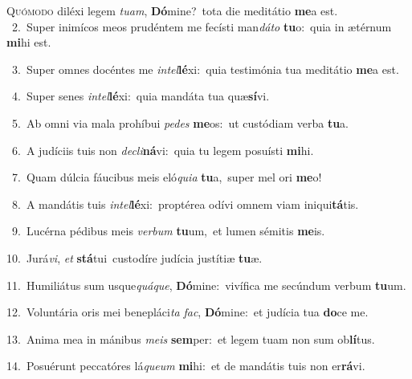 \lettrine{\initial\textcolor{\initialcolor}{Q}}{uómodo} diléxi legem \textit{tu}\-\textit{am}, \textbf{Dó}\-mine?~\star tota die meditátio \textbf{me}\-a est.\\
{\numbfont\textcolor{\numbcolor}{~2.}}~Super inimícos meos prudéntem me fecísti man\-\textit{dá}\-\textit{to} \textbf{tu}\-o:~\star quia in ætérnum \textbf{mi}\-hi est.\par
{\numbfont\textcolor{\numbcolor}{~3.}}~Super omnes docéntes me \textit{in}\-\textit{tel}\textbf{lé}xi:~\star quia testimónia tua meditátio \textbf{me}\-a est.\par
{\numbfont\textcolor{\numbcolor}{~4.}}~Super senes \textit{in}\-\textit{tel}\textbf{lé}xi:~\star quia mandáta tua quæ\-\textbf{sí}\-vi.\par
{\numbfont\textcolor{\numbcolor}{~5.}}~Ab omni via mala prohíbui \textit{pe}\-\textit{des} \textbf{me}\-os:~\star ut custódiam verba \textbf{tu}\-a.\par
{\numbfont\textcolor{\numbcolor}{~6.}}~A judíciis tuis non \textit{de}\-\textit{cli}\textbf{ná}vi:~\star quia tu legem posuísti \textbf{mi}\-hi.\par
{\numbfont\textcolor{\numbcolor}{~7.}}~Quam dúlcia fáucibus meis eló\-\textit{qui}\-\textit{a} \textbf{tu}\-a,~\star super mel ori \textbf{me}\-o!\par
{\numbfont\textcolor{\numbcolor}{~8.}}~A mandátis tuis \textit{in}\-\textit{tel}\textbf{lé}xi:~\star proptérea odívi omnem viam iniqui\-\textbf{tá}\-tis.\par
{\numbfont\textcolor{\numbcolor}{~9.}}~Lucérna pédibus meis \textit{ver}\-\textit{bum} \textbf{tu}\-um,~\star et lumen sémitis \textbf{me}\-is.\par
{\numbfont\textcolor{\numbcolor}{10.}}~Jurá\-\textit{vi}\-, \textit{et} \textbf{stá}\-tui~\star custodíre judícia justítiæ \textbf{tu}\-æ.\par
{\numbfont\textcolor{\numbcolor}{11.}}~Humiliátus sum usque\-\textit{quá}\-\textit{que}, \textbf{Dó}\-mine:~\star vivífica me secúndum verbum \textbf{tu}\-um.\par
{\numbfont\textcolor{\numbcolor}{12.}}~Voluntária oris mei benepláci\textit{ta} \textit{fac}\-, \textbf{Dó}\-mine:~\star et judícia tua \textbf{do}\-ce me.\par
{\numbfont\textcolor{\numbcolor}{13.}}~Anima mea in mánibus \textit{me}\-\textit{is} \textbf{sem}\-per:~\star et legem tuam non sum ob\-\textbf{lí}\-tus.\par
{\numbfont\textcolor{\numbcolor}{14.}}~Posuérunt peccatóres lá\-\textit{que}\-\textit{um} \textbf{mi}\-hi:~\star et de mandátis tuis non er\-\textbf{rá}\-vi.\par
